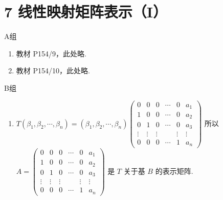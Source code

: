 \section*{7 线性映射矩阵表示（I）}

\vspace{2ex}

\centerline{\heiti A组}
\begin{enumerate}
    \item 教材 P154/9，此处略.
    \item 教材 P154/10，此处略.
\end{enumerate}

\centerline{\heiti B组}
\begin{enumerate}
    \item $T(\beta_1,\beta_2,\cdots,\beta_n)=(\beta_1,\beta_2,\cdots,\beta_n)\begin{pmatrix}0 & 0 & 0 & \cdots & 0 & a_1 \\ 1 & 0 & 0 & \cdots & 0 & a_2 \\ 0 & 1 & 0 & \cdots & 0 & a_3 \\ \vdots & \vdots & \vdots & & \vdots & \vdots \\ 0 & 0 & 0 & \cdots & 1 & a_n\end{pmatrix}$
    所以 $A=\begin{pmatrix}0 & 0 & 0 & \cdots & 0 & a_1 \\ 1 & 0 & 0 & \cdots & 0 & a_2 \\ 0 & 1 & 0 & \cdots & 0 & a_3 \\ \vdots & \vdots & \vdots & & \vdots & \vdots \\ 0 & 0 & 0 & \cdots & 1 & a_n\end{pmatrix}$ 是 $T$ 关于基 $B$ 的表示矩阵.


\end{enumerate}
